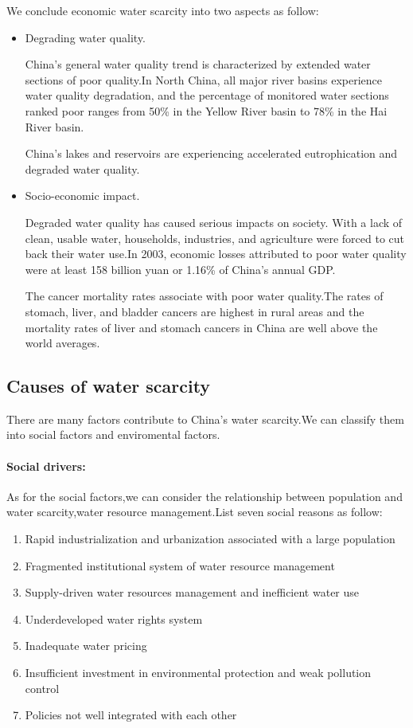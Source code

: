 We conclude economic water scarcity into two aspects as follow:
\begin{itemize}
\item Degrading water quality.

China’s general water quality trend is characterized by extended water sections of poor quality.In North China, all major river basins experience water quality degradation, and the percentage of monitored water sections ranked poor ranges from 50\% in the Yellow River basin to 78\% in the Hai River basin.

China’s lakes and reservoirs are experiencing accelerated eutrophication and degraded water quality.

\item Socio-economic impact.

Degraded water quality has caused serious impacts on society. With a lack of clean, usable water, households, industries, and agriculture were forced to cut back their water use.In 2003, economic losses attributed to poor water quality were at least 158 billion yuan or 1.16\% of China’s annual GDP.

The cancer mortality rates associate with poor water quality.The rates of stomach, liver, and bladder cancers are highest in rural areas and the mortality rates of liver and stomach cancers in China are well above the world averages.
\end{itemize}

\subsection{Causes of water scarcity}
There are many factors contribute to China's water scarcity.We can classify them into social factors and enviromental factors.

\paragraph{Social drivers:}As for the social factors,we can consider the relationship between population and water scarcity,water resource management.List seven social reasons as follow:

\begin{enumerate}
\item Rapid industrialization and urbanization associated with a large population
\item Fragmented institutional system of water resource management
\item Supply-driven water resources management and inefficient water use
\item Underdeveloped water rights system
\item Inadequate water pricing
\item Insufficient investment in environmental protection and weak pollution control
\item Policies not well integrated with each other
\end{enumerate}

